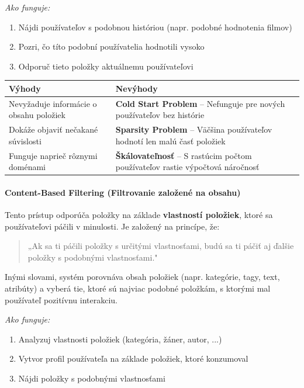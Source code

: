 \textit{Ako funguje:}
\begin{enumerate}
    \item Nájdi používateľov s podobnou históriou (napr. podobné hodnotenia filmov)
    \item Pozri, čo títo podobní používatelia hodnotili vysoko
    \item Odporuč tieto položky aktuálnemu používateľovi
\end{enumerate}

\vspace{1em}

\begin{table}[h!]
\centering
\renewcommand{\arraystretch}{1.4}
\begin{tabular}{>{\raggedright\arraybackslash}p{} >{\raggedright\arraybackslash}p{}}
\toprule
\textbf{Výhody} & \textbf{Nevýhody} \\
\midrule
Nevyžaduje informácie o obsahu položiek &
\textbf{Cold Start Problem} -- Nefunguje pre nových používateľov bez histórie \\[0.5em]
Dokáže objaviť nečakané súvislosti &
\textbf{Sparsity Problem} -- Väčšina používateľov hodnotí len malú časť položiek \\[0.5em]
Funguje naprieč rôznymi doménami &
\textbf{Škálovateľnosť} -- S rastúcim počtom používateľov rastie výpočtová náročnosť \\
\bottomrule
\end{tabular}
\end{table}

\paragraph{Content-Based Filtering (Filtrovanie založené na obsahu)}

Tento prístup odporúča položky na základe \textbf{vlastností položiek}, ktoré sa používateľovi páčili v minulosti.
Je založený na princípe, že:
\begin{quote}
„Ak sa ti páčili položky s určitými vlastnosťami, budú sa ti páčiť aj ďalšie položky s podobnými vlastnosťami."
\end{quote}
Inými slovami, systém porovnáva obsah položiek (napr. kategórie, tagy, text, atribúty) a vyberá tie, ktoré sú najviac podobné položkám, s ktorými mal používateľ pozitívnu interakciu.

\textit{Ako funguje:}
\begin{enumerate}
    \item Analyzuj vlastnosti položiek (kategória, žáner, autor, ...)
    \item Vytvor profil používateľa na základe položiek, ktoré konzumoval
    \item Nájdi položky s podobnými vlastnosťami
\end{enumerate}

